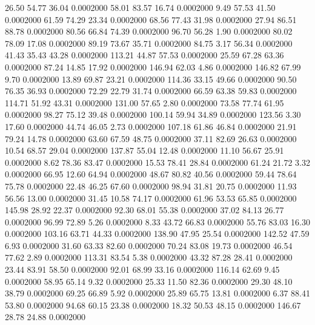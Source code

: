   26.50   54.77   36.04   0.0002000
  58.01   83.57   16.74   0.0002000
   9.49   57.53   41.50   0.0002000
  61.59   74.29   23.34   0.0002000
  68.56   77.43   31.98   0.0002000
  27.94   86.51   88.78   0.0002000
  80.56   66.84   74.39   0.0002000
  96.70   56.28    1.90   0.0002000
  80.02   78.09   17.08   0.0002000
  89.19   73.67   35.71   0.0002000
  84.75    3.17   56.34   0.0002000
  41.43   35.43   43.28   0.0002000
 113.21   44.87   57.53   0.0002000
  25.59   67.28   63.36   0.0002000
  87.24   14.85   17.92   0.0002000
 146.94   62.03    4.86   0.0002000
 146.82   67.99    9.70   0.0002000
  13.89   69.87   23.21   0.0002000
 114.36   33.15   49.66   0.0002000
  90.50   76.35   36.93   0.0002000
  72.29   22.79   31.74   0.0002000
  66.59   63.38   59.83   0.0002000
 114.71   51.92   43.31   0.0002000
 131.00   57.65    2.80   0.0002000
  73.58   77.74   61.95   0.0002000
  98.27   75.12   39.48   0.0002000
 100.14   59.94   34.89   0.0002000
 123.56    3.30   17.60   0.0002000
  44.74   46.05    2.73   0.0002000
 107.18   61.86   46.84   0.0002000
  21.91   79.24   14.78   0.0002000
  63.60   67.59   48.75   0.0002000
  37.11   82.69   26.63   0.0002000
  10.54   68.57   29.04   0.0002000
 137.87   55.04   12.48   0.0002000
  11.10   56.67   25.91   0.0002000
   8.62   78.36   83.47   0.0002000
  15.53   78.41   28.84   0.0002000
  61.24   21.72    3.32   0.0002000
  66.95   12.60   64.94   0.0002000
  48.67   80.82   40.56   0.0002000
  59.44   78.64   75.78   0.0002000
  22.48   46.25   67.60   0.0002000
  98.94   31.81   20.75   0.0002000
  11.93   56.56   13.00   0.0002000
  31.45   10.58   74.17   0.0002000
  61.96   53.53   65.85   0.0002000
 145.98   28.92   22.37   0.0002000
  92.30   68.01   55.38   0.0002000
  37.02   84.13   26.77   0.0002000
  96.99   72.89    5.26   0.0002000
   8.33   43.72   66.83   0.0002000
  55.76   83.03   16.30   0.0002000
 103.16   63.71   44.33   0.0002000
 138.90   47.95   25.54   0.0002000
 142.52   47.59    6.93   0.0002000
  31.60   63.33   82.60   0.0002000
  70.24   83.08   19.73   0.0002000
  46.54   77.62    2.89   0.0002000
 113.31   83.54    5.38   0.0002000
  43.32   87.28   28.41   0.0002000
  23.44   83.91   58.50   0.0002000
  92.01   68.99   33.16   0.0002000
 116.14   62.69    9.45   0.0002000
  58.95   65.14    9.32   0.0002000
  25.33   11.50   82.36   0.0002000
  29.30   48.10   38.79   0.0002000
  69.25   66.89    5.92   0.0002000
  25.89   65.75   13.81   0.0002000
   6.37   88.41   53.80   0.0002000
  94.68   60.15   23.38   0.0002000
  18.32   50.53   48.15   0.0002000
 146.67   28.78   24.88   0.0002000

